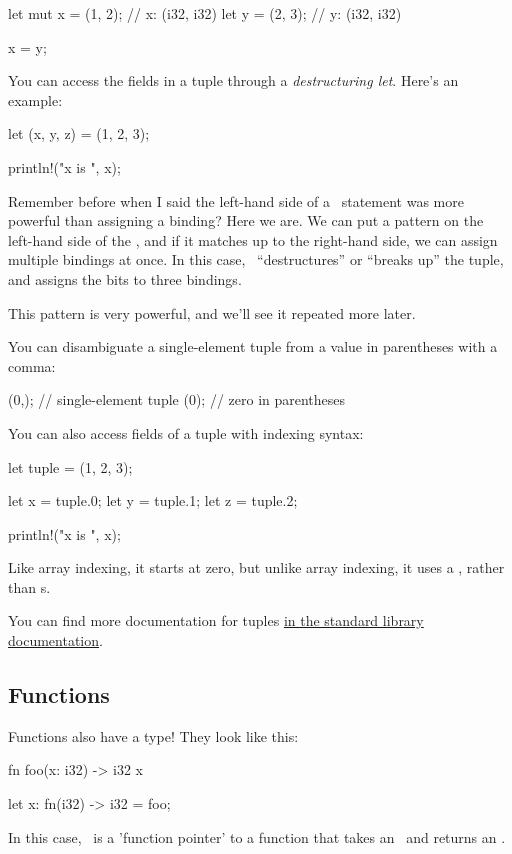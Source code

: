 \begin{rustc}
let mut x = (1, 2); // x: (i32, i32)
let y = (2, 3); // y: (i32, i32)

x = y;
\end{rustc}

You can access the fields in a tuple through a \emph{destructuring let}. Here's an example:

\begin{rustc}
let (x, y, z) = (1, 2, 3);

println!("x is {}", x);
\end{rustc}

Remember before when I said the left-hand side of a \keylet\ statement was more powerful than assigning a binding? Here we are. 
We can put a pattern on the left-hand side of the \keylet, and if it matches up to the right-hand side, we can assign multiple 
bindings at once. In this case, \keylet\ “destructures” or “breaks up” the tuple, and assigns the bits to three bindings.

\blank

This pattern is very powerful, and we'll see it repeated more later.

\blank

You can disambiguate a single-element tuple from a value in parentheses with a comma:

\begin{rustc}
(0,); // single-element tuple
(0); // zero in parentheses
\end{rustc}


You can also access fields of a tuple with indexing syntax:

\begin{rustc}
let tuple = (1, 2, 3);

let x = tuple.0;
let y = tuple.1;
let z = tuple.2;

println!("x is {}", x);
\end{rustc}

Like array indexing, it starts at zero, but unlike array indexing, it uses a , rather than \code{[]}s.

\blank

You can find more documentation for tuples \href{https://doc.rust-lang.org/std/primitive.tuple.html}{in the standard library 
documentation}.

\subsection*{Functions}

Functions also have a type! They look like this:

\begin{rustc}
fn foo(x: i32) -> i32 { x }

let x: fn(i32) -> i32 = foo;
\end{rustc}

In this case, \x\ is a 'function pointer' to a function that takes an \itt\ and returns an \itt.

